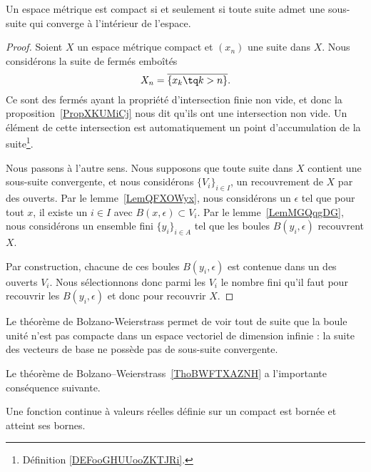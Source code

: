 \begin{theorem}\label{ThoBWFTXAZNH}
	Un espace métrique est compact si et seulement si toute suite admet une sous-suite qui converge à l'intérieur de l'espace.
\end{theorem}

\begin{proof}
	Soient \( X\) un espace métrique compact et \( (x_n)\) une suite dans \( X\). Nous considérons la suite de fermés emboîtés
	\begin{equation}
		X_n=\overline{ \{ x_k\tq k>n \} }.
	\end{equation}
	Ce sont des fermés ayant la propriété d'intersection finie non vide, et donc la proposition~\ref{PropXKUMiCj} nous dit qu'ils ont une intersection non vide. Un élément de cette intersection est automatiquement un point d'accumulation de la suite\footnote{Définition \ref{DEFooGHUUooZKTJRi}.}.

	Nous passons à l'autre sens. Nous supposons que toute suite dans \( X\) contient une sous-suite convergente, et nous considérons \( \{ V_i \}_{i\in I}\), un recouvrement de \( X\) par des ouverts. Par le lemme~\ref{LemQFXOWyx}, nous considérons un \( \epsilon\) tel que pour tout \( x\), il existe un \( i\in I\) avec \( B(x,\epsilon)\subset V_i\). Par le lemme~\ref{LemMGQqgDG}, nous considérons un ensemble fini \( \{ y_i \}_{i\in A}\) tel que les boules \( B(y_i,\epsilon)\) recouvrent \( X\).

	Par construction, chacune de ces boules \( B(y_i,\epsilon)\) est contenue dans un des ouverts \( V_i\). Nous sélectionnons donc parmi les \( V_i\) le nombre fini qu'il faut pour recouvrir les \( B(y_i,\epsilon)\) et donc pour recouvrir \( X\).
\end{proof}

\begin{example}\label{ExEFYooTILPDk}
	Le théorème de Bolzano-Weierstrass permet de voir tout de suite que la boule unité n'est pas compacte dans un espace vectoriel de dimension infinie : la suite des vecteurs de base ne possède pas de sous-suite convergente.
\end{example}


Le théorème de Bolzano–Weierstrass~\ref{ThoBWFTXAZNH} a l'importante conséquence suivante.
\begin{theorem}[Weierstrass]		\label{ThoWeirstrassRn}
	Une fonction continue à valeurs réelles définie sur un compact est bornée et atteint ses bornes.
\end{theorem}

